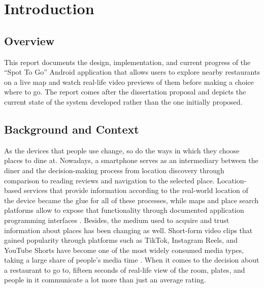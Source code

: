 \documentclass[12pt, a4paper]{article}
\begin{document}
\newpage
\tableofcontents
\clearpage


\section{Introduction}

\subsection{Overview}

This report documents the design, implementation, and current progress of the ``Spot To Go'' Android application that allows users to explore nearby restaurants on a live map and watch real-life video previews of them before making a choice where to go. The report comes after the dissertation proposal and depicts the current state of the system developed rather than the one initially proposed.

\subsection{Background and Context}

As the devices that people use change, so do the ways in which they choose places to dine at. Nowadays, a smartphone serves as an intermediary between the diner and the decision-making process from location discovery through comparison to reading reviews and navigation to the selected place. Location-based services that provide information according to the real-world location of the device became the glue for all of these processes, while maps and place search platforms allow to expose that functionality through documented application programming interfaces \citep{google_places, android_location}. Besides, the medium used to acquire and trust information about places has been changing as well. Short-form video clips that gained popularity through platforms such as TikTok, Instagram Reels, and YouTube Shorts have become one of the most widely consumed media types, taking a large share of people's media time \citep{datareportal2024, montag2021}. When it comes to the decision about a restaurant to go to, fifteen seconds of real-life view of the room, plates, and people in it communicate a lot more than just an average rating.
\end{document}
